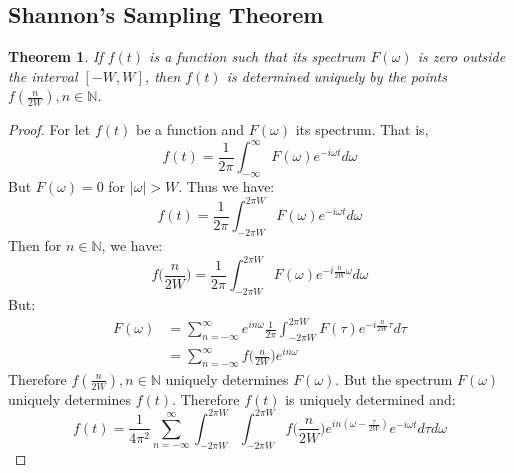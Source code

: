 \documentclass{article}
\theoremstyle{mystyle}
\newtheorem{theorem}{Theorem}[section]
\begin{document}
\subsection{Shannon's Sampling Theorem}
\begin{theorem}
If $f(t)$ is a function such that its spectrum $F(\omega)$ is zero outside the interval $[-W,W]$, then $f(t)$ is determined uniquely by the points $f(\frac{n}{2W}), n\in \mathbb{N}$.
\end{theorem}
\begin{proof}
For let $f(t)$ be a function and $F(\omega)$ its spectrum. That is,
\begin{equation*}
f(t) = \frac{1}{2\pi}\int_{-\infty}^{\infty} F(\omega)e^{-i\omega t}d\omega
\end{equation*}
But $F(\omega) = 0$ for $|\omega| > W$. Thus we have:
\begin{equation*}
f(t) = \frac{1}{2\pi}\int_{-2\pi W}^{2\pi W}F(\omega)e^{-i\omega t}d\omega
\end{equation*}
Then for $n\in \mathbb{N}$, we have:
\begin{equation*}
f\big(\frac{n}{2W}\big) = \frac{1}{2\pi}\int_{-2\pi W}^{2\pi W}F(\omega) e^{-i\frac{n}{2W}\omega}d\omega
\end{equation*}
But:
\begin{align*}
F(\omega) &= \sum_{n=-\infty}^{\infty}e^{in\omega}\frac{1}{2\pi}\int_{-2\pi W}^{2\pi W}F(\tau)e^{-i\frac{n}{2W}\tau}d\tau\\
&= \sum_{n=-\infty}^{\infty}f\big(\frac{n}{2W}\big)e^{in\omega}
\end{align*}
Therefore $f(\frac{n}{2W}), n\in \mathbb{N}$ uniquely determines $F(\omega)$. But the spectrum $F(\omega)$ uniquely determines $f(t)$. Therefore $f(t)$ is uniquely determined and:
\begin{equation*}
f(t) = \frac{1}{4\pi^2}\sum_{n=-\infty}^{\infty}\int_{-2\pi W}^{2\pi W}\int_{-2\pi W}^{2\pi W}f\big(\frac{n}{2W}\big)e^{in(\omega-\frac{\tau}{2W})}e^{-i\omega t}d\tau d\omega
\end{equation*}

\end{proof}
\end{document}

